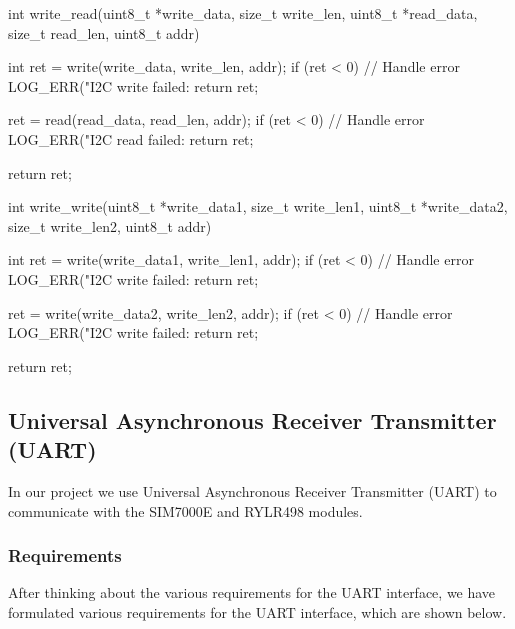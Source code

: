 \begin{cpp}
int write_read(uint8_t *write_data, size_t write_len, uint8_t *read_data, size_t read_len, uint8_t addr){
    int ret = write(write_data, write_len, addr);
    if (ret < 0)
    {
        // Handle error
        LOG_ERR("I2C write failed: %
        return ret;
    }

    ret = read(read_data, read_len, addr);
    if (ret < 0)
    {
        // Handle error
        LOG_ERR("I2C read failed: %
        return ret;
    }

    return ret;
}

int write_write(uint8_t *write_data1, size_t write_len1, uint8_t *write_data2, size_t write_len2, uint8_t addr){
    int ret = write(write_data1, write_len1, addr);
    if (ret < 0)
    {
        // Handle error
        LOG_ERR("I2C write failed: %
        return ret;
    }

    ret = write(write_data2, write_len2, addr);
    if (ret < 0)
    {
        // Handle error
        LOG_ERR("I2C write failed: %
        return ret;
    }

    return ret;
}
\end{cpp}

\subsection{Universal Asynchronous Receiver Transmitter (UART)}

In our project we use Universal Asynchronous Receiver Transmitter (UART) to communicate with the SIM7000E and RYLR498 modules.

\subsubsection{Requirements}

After thinking about the various requirements for the UART interface, we have formulated various requirements for the UART interface, which are shown below.

